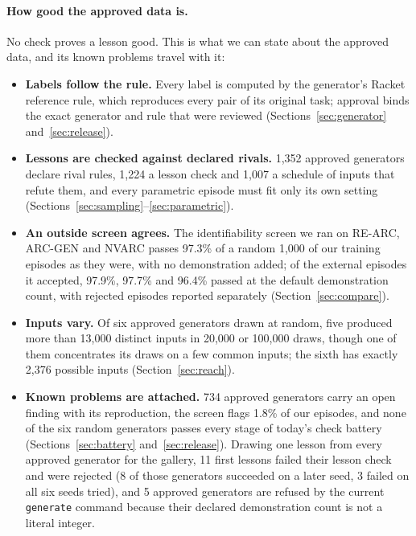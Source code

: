 \documentclass[11pt]{article}
\begin{document}
\paragraph{How good the approved data is.} No check proves a lesson good.
This is what we can state about the approved data, and its known problems
travel with it:
\begin{itemize}[nosep]
  \item \textbf{Labels follow the rule.} Every label is computed by the
  generator's Racket reference rule, which reproduces every pair of its
  original task; approval binds the exact generator and rule that were
  reviewed (Sections~\ref{sec:generator} and~\ref{sec:release}).
  \item \textbf{Lessons are checked against declared rivals.} 1,352 approved
  generators declare rival rules, 1,224 a lesson check and 1,007 a schedule of
  inputs that refute them, and every parametric episode must fit only its own
  setting (Sections~\ref{sec:sampling}--\ref{sec:parametric}).
  \item \textbf{An outside screen agrees.} The identifiability screen we ran
  on RE-ARC, ARC-GEN and NVARC passes 97.3\% of a random 1,000 of our training
  episodes as they were, with no demonstration added; of the external episodes
  it accepted, 97.9\%, 97.7\% and 96.4\% passed at the default demonstration
  count, with rejected episodes reported separately (Section~\ref{sec:compare}).
  \item \textbf{Inputs vary.} Of six approved generators drawn at random, five
  produced more than 13,000 distinct inputs in 20,000 or 100,000 draws, though
  one of them concentrates its draws on a few common inputs; the sixth has
  exactly 2,376 possible inputs (Section~\ref{sec:reach}).
  \item \textbf{Known problems are attached.} 734 approved generators carry
  an open finding with its reproduction, the screen flags 1.8\% of our
  episodes, and none of the six random generators passes every stage of
  today's check battery (Sections~\ref{sec:battery} and~\ref{sec:release}).
  Drawing one lesson from every approved generator for the gallery, 11 first
  lessons failed their lesson check and were rejected (8 of those generators
  succeeded on a later seed, 3 failed on all six seeds tried), and 5 approved
  generators are refused by the current \texttt{generate} command because
  their declared demonstration count is not a literal integer.
\end{itemize}
\end{document}

